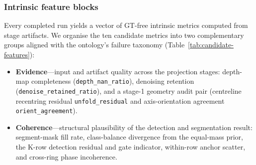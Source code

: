 \documentclass[a4paper,fleqn]{cas-dc}
\begin{document}
\subsubsection{Intrinsic feature blocks}\label{sec:features}

Every completed run yields a vector of GT-free intrinsic metrics computed from stage artifacts. We organise the ten candidate metrics into two complementary groups aligned with the ontology's failure taxonomy (Table~\ref{tab:candidate-features}):

\begin{itemize}
\item \textbf{Evidence}---input and artifact quality across the projection stages: depth-map completeness (\texttt{depth\_nan\_ratio}), denoising retention (\texttt{denoise\_retained\_ratio}), and a stage-1 geometry audit pair (centreline recentring residual \texttt{unfold\_residual} and axis-orientation agreement \texttt{orient\_agreement}).
\item \textbf{Coherence}---structural plausibility of the detection and segmentation result: segment-mask fill rate, class-balance divergence from the equal-mass prior, the K-row detection residual and gate indicator, within-row anchor scatter, and cross-ring phase incoherence.
\end{itemize}
\end{document}
